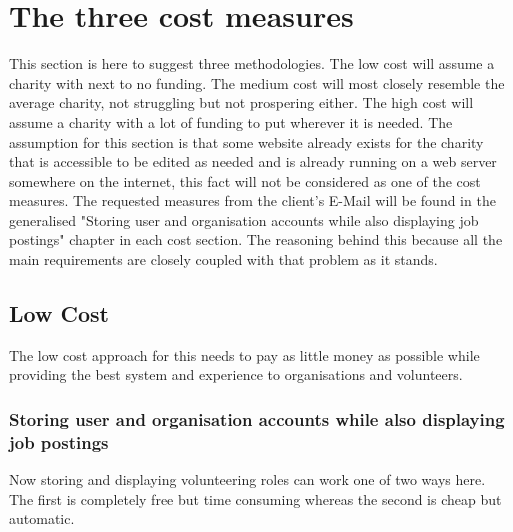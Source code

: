 \documentclass[11pt,a4paper]{article}
\begin{document}
\section{The three cost measures}

This section is here to suggest three methodologies. The low cost will assume a charity with next to no funding. The medium cost will most closely resemble the average charity, not struggling but not prospering either. The high cost will assume a charity with a lot of funding to put wherever it is needed. The assumption for this section is that some website already exists for the charity that is accessible to be edited as needed and is already running on a web server somewhere on the internet, this fact will not be considered as one of the cost measures. The requested measures from the client's E-Mail will be found in the generalised "Storing user and organisation accounts while also displaying job postings" chapter in each cost section. The reasoning behind this because all the main requirements are closely coupled with that problem as it stands. 

\subsection{Low Cost}

The low cost approach for this needs to pay as little money as possible while providing the best system and experience to organisations and volunteers.

\subsubsection{Storing user and organisation accounts while also displaying job postings}

Now storing and displaying volunteering roles can work one of two ways here. The first is completely free but time consuming whereas the second is cheap but automatic. 
\end{document}
